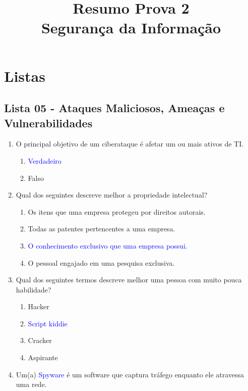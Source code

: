 \documentclass{report}
\title{Resumo Prova 2\\ Segurança da Informação}
\begin{document}
	\maketitle
	
	\section{Listas}
	
	\subsection{Lista 05 - Ataques Maliciosos, Ameaças e Vulnerabilidades}
	
	\begin{enumerate}
		\item O principal objetivo de um ciberataque é afetar um ou mais ativos de TI.  
		\begin{enumerate}[label=(\alph*)]
			\item \textcolor{blue}{Verdadeiro}
			\item Falso
		\end{enumerate}
		
		\item Qual dos seguintes descreve melhor a propriedade intelectual?  
		\begin{enumerate}[label=(\alph*)]
			\item Os itens que uma empresa protegeu por direitos autorais.
			\item Todas as patentes pertencentes a uma empresa.
			\item \textcolor{blue}{O conhecimento exclusivo que uma empresa possui.}
			\item O pessoal engajado em uma pesquisa exclusiva.
		\end{enumerate}
		
		\item Qual dos seguintes termos descreve melhor uma pessoa com muito pouca habilidade?  
		\begin{enumerate}[label=(\alph*)]
			\item Hacker
			\item \textcolor{blue}{Script kiddie}
			\item Cracker
			\item Aspirante
		\end{enumerate}
		
		\item Um(a) \textcolor{blue}{Spyware} é um software que captura tráfego enquanto ele atravessa uma rede.
		

\end{enumerate}
\end{document}
